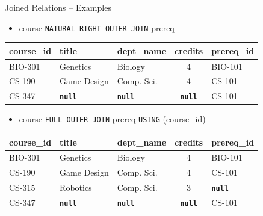\documentclass[aspectratio=169]{beamer}
\begin{document}
\begin{frame}{Joined Relations – Examples}
    \begin{itemize}
        \item course \texttt{NATURAL RIGHT OUTER JOIN} prereq
    \end{itemize}
    \scriptsize
    \begin{tabular}{| l | l | l | c | l |}
        \hline
        \textbf{course\_id} & \textbf{title} & \textbf{dept\_name} & \textbf{credits} & \textbf{prereq\_id} \\
        \hline
        BIO-301 & Genetics    & Biology    & 4 & BIO-101 \\
        \hline
        CS-190  & Game Design & Comp. Sci. & 4 & CS-101  \\
        \hline
        CS-347  & \textbf{\texttt{null}}   & \textbf{\texttt{null}} & \textbf{\texttt{null}} & CS-101 \\
        \hline
    \end{tabular}
    \vspace{5mm}
    \normalsize
    \begin{itemize}
        \item course \texttt{FULL OUTER JOIN} prereq \texttt{USING} (course\_id)
    \end{itemize}
    \scriptsize
    \begin{tabular}{| l | l | l | c | l |}
        \hline
        \textbf{course\_id} & \textbf{title} & \textbf{dept\_name} & \textbf{credits} & \textbf{prereq\_id} \\
        \hline
        BIO-301 & Genetics    & Biology    & 4 & BIO-101 \\
        \hline
        CS-190  & Game Design & Comp. Sci. & 4 & CS-101  \\
        \hline
        CS-315  & Robotics    & Comp. Sci. & 3 & \textbf{\texttt{null}}\\
        \hline
        CS-347  & \textbf{\texttt{null}}   & \textbf{\texttt{null}} & \textbf{\texttt{null}} & CS-101 \\
        \hline
    \end{tabular}
\end{frame}
\end{document}
